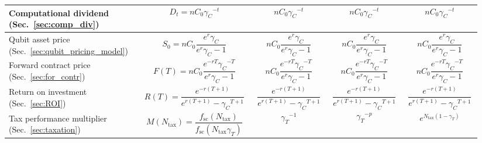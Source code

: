 \begin{table}[!htb]
\begin{tabular}{|p{0.255\linewidth}|p{0.22\linewidth}|p{0.155\linewidth}|p{0.155\linewidth}|p{0.155\linewidth}|}
	\hline
	Computational dividend (Sec.~\ref{sec:comp_div}) & \[D_t=n C_0 {\gamma_C}^{-t}\] & \[n C_0 {\gamma_C}^{-t}\] & \[n C_0 {\gamma_C}^{-t}\] & \[n C_0 {\gamma_C}^{-t}\]\\
	\hline
	Qubit asset price (Sec.~\ref{sec:qubit_pricing_model}) & \[S_0=n C_0 \frac{e^r \gamma_C}{e^r \gamma_C - 1}\] & \[n C_0 \frac{e^r \gamma_C}{e^r \gamma_C - 1}\] & \[n C_0 \frac{e^r \gamma_C}{e^r \gamma_C - 1}\] & \[n C_0 \frac{e^r \gamma_C}{e^r \gamma_C - 1}\]\\
	\hline
	Forward contract price (Sec.~\ref{sec:for_contr}) & \[F(T)=n C_0 \frac{e^{-rT}{\gamma_C}^{-T}}{e^{r}\gamma_C-1}\] & \[n C_0 \frac{e^{-rT}{\gamma_C}^{-T}}{e^{r}\gamma_C-1}\] & \[n C_0 \frac{e^{-rT}{\gamma_C}^{-T}}{e^{r}\gamma_C-1}\] & \[n C_0 \frac{e^{-rT}{\gamma_C}^{-T}}{e^{r}\gamma_C-1}\]\\
	\hline
	Return on investment (Sec.~\ref{sec:ROI}) & \[R(T)=\frac{e^{-r(T+1)}}{e^{r(T+1)}-{\gamma_C}^{T+1}}\] & \[\frac{e^{-r(T+1)}}{e^{r(T+1)}-{\gamma_C}^{T+1}}\] & \[\frac{e^{-r(T+1)}}{e^{r(T+1)}-{\gamma_C}^{T+1}}\] & \[\frac{e^{-r(T+1)}}{e^{r(T+1)}-{\gamma_C}^{T+1}}\]\\
	\hline
	Tax performance multiplier (Sec.~\ref{sec:taxation}) & \[M(N_\text{tax})=\frac{f_\text{sc}(N_\text{tax})}{f_\text{sc}(N_\text{tax} \gamma_T)}\] & \[{\gamma_T}^{-1}\] & \[{\gamma_T}^{-p}\] & \[e^{N_\text{tax}(1-\gamma_T)}\]\\
	\hline
\end{tabular}
\end{table}

\renewcommand{\arraystretch}{1}
\renewcommand{\tablename}{ALG.}